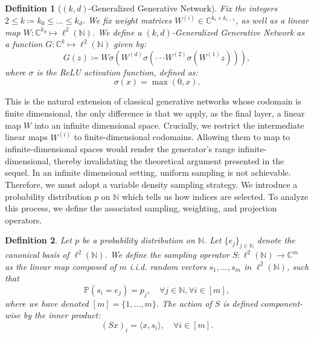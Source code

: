 \documentclass[a4paper,oneside]{amsart}
\newtheorem{definition}{Definition}[section]
\newcommand{\lnn}{\ell^2(\mathbb{N})}
\begin{document}
\begin{definition}[$(k,d)$-Generalized Generative Network]
    Fix the integers $2\leq k \coloneqq k_0 \leq ... \leq k_d$. We fix weight matrices $W^{(i)} \in \mathbb{C}^{k_i \times k_{i-1}}$, as well as a linear map $W \colon \mathbb{C}^{k_d} \longmapsto \lnn$. We define a $(k,d)$-Generalized Generative Network as a function $G\colon\mathbb{C}^k \longmapsto \lnn$ given by:
    \begin{equation*}
        G(z) \coloneqq W \sigma \left( W^{(d)} \sigma\left( \cdot\cdot\cdot W^{(2)} \sigma \left( W^{(1)} z \right)\right) \right),
    \end{equation*}
    where $\sigma$ is the ReLU activation function, defined as:
    \begin{equation*}
        \sigma(x) = \max(0, x).
    \end{equation*}
\end{definition}
This is the natural extension of classical generative networks whose codomain is finite dimensional, the only difference is that we apply, as the final layer, a linear map $W$ into an infinite dimensional space. Crucially, we restrict the intermediate linear maps $W^{(i)}$ to finite-dimensional codomains. Allowing them to map to infinite-dimensional spaces would render the generator's range infinite-dimensional, thereby invalidating the theoretical argument presented in the sequel.
In an infinite dimensional setting, uniform sampling is not achievable. Therefore, we must adopt a variable density sampling strategy. We introduce a probability distribution $p$ on $\mathbb{N}$ which tells us how indices are selected. To analyze this process, we define the associated sampling, weighting, and projection operators.
\begin{definition}
Let $p$ be a probability distribution on $\mathbb{N}$. Let $\{e_j\}_{j \in \mathbb{N}}$ denote the canonical basis of $\ell^2(\mathbb{N})$.
We define the sampling operator $S: \ell^2(\mathbb{N}) \to \mathbb{C}^m$ as the linear map composed of $m$ i.i.d. random vectors $s_1, \dots, s_m$ in $\ell^2(\mathbb{N})$, such that
\begin{equation*}
\mathbb{P}(s_i = e_j) = p_j, \quad \forall j \in \mathbb{N}, \forall i \in [m],
\end{equation*}
where we have denoted $[m]=\{1,\dots,m\}$. The action of $S$ is defined component-wise by the inner product:
\begin{equation*}
(Sx)_i = \langle x, s_i \rangle, \quad \forall i \in [m].
\end{equation*}
\end{definition}
\end{document}
